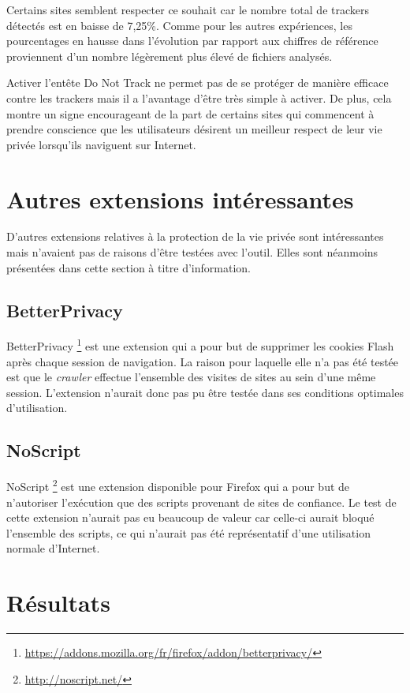 Certains sites semblent respecter ce souhait car le nombre total de trackers détectés est en baisse de 7,25\%. Comme pour les autres expériences, les pourcentages en hausse dans l'évolution par rapport aux chiffres de référence proviennent d'un nombre légèrement plus élevé de fichiers analysés.

Activer l'entête Do Not Track ne permet pas de se protéger de manière efficace contre les trackers mais il a l'avantage d'être très simple à activer. De plus, cela montre un signe encourageant de la part de certains sites qui commencent à prendre conscience que les utilisateurs désirent un meilleur respect de leur vie privée lorsqu'ils naviguent sur Internet.


\section{Autres extensions intéressantes}
D'autres extensions relatives à la protection de la vie privée sont intéressantes mais n'avaient pas de raisons d'être testées avec l'outil. Elles sont néanmoins présentées dans cette section à titre d'information.

\subsection{BetterPrivacy}
BetterPrivacy \footnote{\url{https://addons.mozilla.org/fr/firefox/addon/betterprivacy/}} est une extension qui a pour but de supprimer les cookies Flash après chaque session de navigation. La raison pour laquelle elle n'a pas été testée est que le \textit{crawler} effectue l'ensemble des visites de sites au sein d'une même session. L'extension n'aurait donc pas pu être testée dans ses conditions optimales d'utilisation.

\subsection{NoScript}
NoScript \footnote{\url{http://noscript.net/}} est une extension disponible pour Firefox qui a pour but de n'autoriser l'exécution que des scripts provenant de sites de confiance. Le test de cette extension n'aurait pas eu beaucoup de valeur car celle-ci aurait bloqué l'ensemble des scripts, ce qui n'aurait pas été représentatif d'une utilisation normale d'Internet.

\section{Résultats}
\label{results_plugins}

